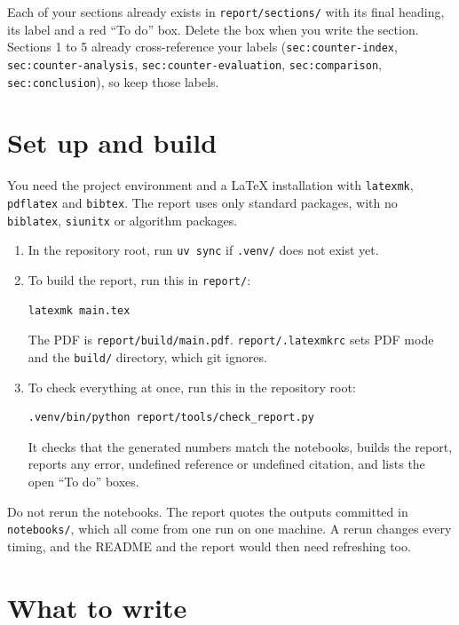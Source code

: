 \documentclass[11pt,a4paper]{article}
\newcommand{\file}[1]{\texttt{#1}}
\begin{document}
Each of your sections already exists in \file{report/sections/} with its final heading, its label and a red
``To do'' box. Delete the box when you write the section. Sections 1 to 5 already cross-reference your labels
(\file{sec:counter-index}, \file{sec:counter-analysis}, \file{sec:counter-evaluation}, \file{sec:comparison},
\file{sec:conclusion}), so keep those labels.

\section{Set up and build}

You need the project environment and a LaTeX installation with \file{latexmk}, \file{pdflatex} and \file{bibtex}.
The report uses only standard packages, with no \file{biblatex}, \file{siunitx} or algorithm packages.
\begin{enumerate}
  \item In the repository root, run \file{uv sync} if \file{.venv/} does not exist yet.
  \item To build the report, run this in \file{report/}:
\begin{lstlisting}
latexmk main.tex
\end{lstlisting}
        The PDF is \file{report/build/main.pdf}. \file{report/.latexmkrc} sets PDF mode and the \file{build/}
        directory, which git ignores.
  \item To check everything at once, run this in the repository root:
\begin{lstlisting}
.venv/bin/python report/tools/check_report.py
\end{lstlisting}
        It checks that the generated numbers match the notebooks, builds the report, reports any error,
        undefined reference or undefined citation, and lists the open ``To do'' boxes.
\end{enumerate}
Do not rerun the notebooks. The report quotes the outputs committed in \file{notebooks/}, which all come from one
run on one machine. A rerun changes every timing, and the README and the report would then need refreshing too.

\section{What to write}
\end{document}
